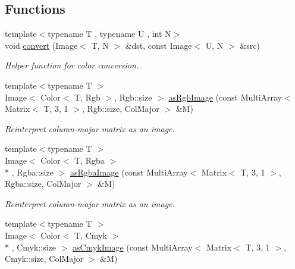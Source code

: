 \subsection*{Functions}
\begin{DoxyCompactItemize}
\item 
\hypertarget{group___image_ga4e5c520a37ac3ab27aa74f10d3c47b25}{{\footnotesize template$<$typename T , typename U , int N$>$ }\\void \hyperlink{group___image_ga4e5c520a37ac3ab27aa74f10d3c47b25}{convert} (Image$<$ T, N $>$ \&dst, const Image$<$ U, N $>$ \&src)}\label{group___image_ga4e5c520a37ac3ab27aa74f10d3c47b25}

\begin{DoxyCompactList}\small\item\em Helper function for color conversion. \end{DoxyCompactList}\item 
\hypertarget{group___image_ga6ca7c2968f16fe642348e58d2d72c3d8}{{\footnotesize template$<$typename T $>$ }\\Image$<$ Color$<$ T, Rgb $>$, Rgb\-::size $>$ \hyperlink{group___image_ga6ca7c2968f16fe642348e58d2d72c3d8}{as\-Rgb\-Image} (const Multi\-Array$<$ Matrix$<$ T, 3, 1 $>$, Rgb\-::size, Col\-Major $>$ \&M)}\label{group___image_ga6ca7c2968f16fe642348e58d2d72c3d8}

\begin{DoxyCompactList}\small\item\em Reinterpret column-\/major matrix as an image. \end{DoxyCompactList}\item 
\hypertarget{group___image_ga4392375bc20250c8f8cf6c571ab3e5c8}{{\footnotesize template$<$typename T $>$ }\\Image$<$ Color$<$ T, Rgba $>$\\*
, Rgba\-::size $>$ \hyperlink{group___image_ga4392375bc20250c8f8cf6c571ab3e5c8}{as\-Rgba\-Image} (const Multi\-Array$<$ Matrix$<$ T, 3, 1 $>$, Rgba\-::size, Col\-Major $>$ \&M)}\label{group___image_ga4392375bc20250c8f8cf6c571ab3e5c8}

\begin{DoxyCompactList}\small\item\em Reinterpret column-\/major matrix as an image. \end{DoxyCompactList}\item 
\hypertarget{group___image_ga03047b50e8796b06624fbd45ac3c46ec}{{\footnotesize template$<$typename T $>$ }\\Image$<$ Color$<$ T, Cmyk $>$\\*
, Cmyk\-::size $>$ \hyperlink{group___image_ga03047b50e8796b06624fbd45ac3c46ec}{as\-Cmyk\-Image} (const Multi\-Array$<$ Matrix$<$ T, 3, 1 $>$, Cmyk\-::size, Col\-Major $>$ \&M)}\label{group___image_ga03047b50e8796b06624fbd45ac3c46ec}


\end{DoxyCompactItemize}
